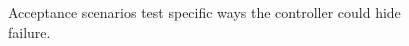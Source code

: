 \begin{figure}[H]
\centering
{}
\caption{Acceptance scenarios test specific ways the controller could hide failure.}\label{fig:teach-M06-25}
\end{figure}
